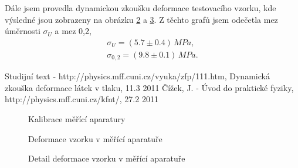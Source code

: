 \documentclass[a4paper,12pt]{article}
\begin{document}
Dále jsem provedla dynamickou zkoušku deformace testovacího vzorku,
kde výsledné jsou zobrazeny na obrázku \ref{vzorek} a \ref{detail}.
Z těchto grafů jsem odečetla mez úměrnosti $\sigma_U$ a mez 0,2,
\begin{eqnarray}
\nonumber \sigma_U = (5.7 \pm 0.4) \, MPa , \\
\nonumber \sigma_{0,2} = (9.8 \pm 0.1) \, MPa.
\end{eqnarray}


\begin{thebibliography}{99}
 Studijní text - http://physics.mff.cuni.cz/vyuka/zfp/111.htm, Dynamická zkouška deformace látek v tlaku, 11.3 2011
 Čížek, J. - Úvod do praktické fyziky, http://physics.mff.cuni.cz/kfnt/, 27.2 2011
\end{thebibliography}

\begin{figure}[!htb]

\caption{Kalibrace měřící aparatury}
\label{kalibrace}
\end{figure}


\begin{figure}[!htb]

\caption{Deformace vzorku v měřící aparatuře}
\label{vzorek}
\end{figure}

\begin{figure}[!htb]

\caption{Detail deformace vzorku v měřící aparatuře}
\label{detail}
\end{figure}
\end{document}
